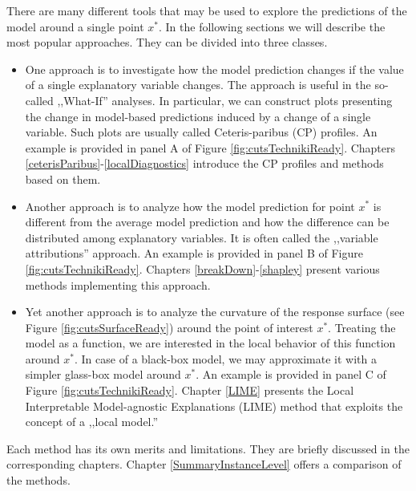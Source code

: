 \documentclass[12pt,]{krantz}
\providecommand{\tightlist}{%
  \setlength{\itemsep}{0pt}\setlength{\parskip}{0pt}}
\begin{document}
There are many different tools that may be used to explore the predictions of the model around a single point \(x^*\). In the following sections we will describe the most popular approaches. They can be divided into three classes.

\begin{itemize}
\tightlist
\item
  One approach is to investigate how the model prediction changes if the value of a single explanatory variable changes. The approach is useful in the so-called ,,What-If'' analyses. In particular, we can construct plots presenting the change in model-based predictions induced by a change of a single variable. Such plots are usually called Ceteris-paribus (CP) profiles. An example is provided in panel A of Figure \ref{fig:cutsTechnikiReady}. Chapters \ref{ceterisParibus}-\ref{localDiagnostics} introduce the CP profiles and methods based on them.\\
\item
  Another approach is to analyze how the model prediction for point \(x^*\) is different from the average model prediction and how the difference can be distributed among explanatory variables. It is often called the ,,variable attributions'' approach. An example is provided in panel B of Figure \ref{fig:cutsTechnikiReady}. Chapters \ref{breakDown}-\ref{shapley} present various methods implementing this approach.
\item
  Yet another approach is to analyze the curvature of the response surface (see Figure \ref{fig:cutsSurfaceReady}) around the point of interest \(x^*\). Treating the model as a function, we are interested in the local behavior of this function around \(x^*\). In case of a black-box model, we may approximate it with a simpler glass-box model around \(x^*\). An example is provided in panel C of Figure \ref{fig:cutsTechnikiReady}. Chapter \ref{LIME} presents the Local Interpretable Model-agnostic Explanations (LIME) method that exploits the concept of a ,,local model.''
\end{itemize}

Each method has its own merits and limitations. They are briefly discussed in the corresponding chapters. Chapter \ref{SummaryInstanceLevel} offers a comparison of the methods.
\end{document}
